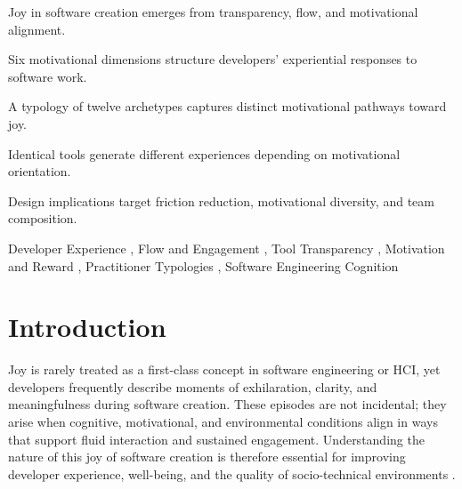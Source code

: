 \documentclass[12pt]{elsarticle}
\begin{document}
\begin{frontmatter}
\begin{highlights}
\item Joy in software creation emerges from transparency, flow, and motivational alignment.
\item Six motivational dimensions structure developers' experiential responses to software work.
\item A typology of twelve archetypes captures distinct motivational pathways toward joy.
\item Identical tools generate different experiences depending on motivational orientation.
\item Design implications target friction reduction, motivational diversity, and team composition.
\end{highlights}

\begin{keyword}
Developer Experience \sep
Flow and Engagement \sep
Tool Transparency \sep
Motivation and Reward \sep
Practitioner Typologies \sep
Software Engineering Cognition
\end{keyword}

\end{frontmatter}







\section{Introduction}\label{sec:introduction}

Joy is rarely treated as a first-class concept in software engineering or HCI, 
yet developers frequently describe moments of exhilaration, clarity, and 
meaningfulness during software creation. These episodes are not incidental; 
they arise when cognitive, motivational, and environmental conditions align in 
ways that support fluid interaction and sustained engagement. Understanding the 
nature of this joy of software creation is therefore essential for improving 
developer experience, well-being, and the quality of socio-technical 
environments \cite{ford2015exploring, graziotin2014happy}.
\end{document}
